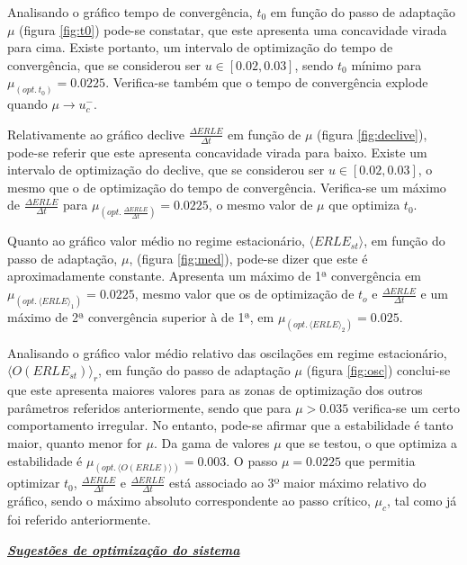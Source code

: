 \documentclass[a4paper,11pt]{report}
\begin{document}
     
Analisando o gráfico tempo de convergência, $t_0$ em função do passo de adaptação $\mu$ (figura \ref{fig:t0}) pode-se constatar, que este apresenta uma concavidade virada para cima. Existe portanto, um intervalo de optimização do tempo de convergência,  que se considerou ser $u\in[0.02,0.03]$, sendo $t_0$ mínimo para $\mu_{(opt. \hspace{2pt} t_0)}=0.0225$. Verifica-se também que o tempo de convergência explode quando $\mu \to u_c^-$.\\
\par
Relativamente ao gráfico declive $\frac{\Delta ERLE}{\Delta t}$ em função de $\mu$ (figura \ref{fig:declive}), pode-se referir que este apresenta concavidade virada para baixo. Existe  um intervalo de optimização do declive,  que se considerou ser $u\in[0.02,0.03]$, o mesmo que o de optimização do tempo de convergência. Verifica-se um máximo de $\frac{\Delta ERLE}{\Delta t}$ para $\mu_{(opt. \hspace{2pt} \frac{\Delta ERLE}{\Delta t})}=0.0225$, o mesmo valor de $\mu$ que optimiza $t_0$.\\

\par Quanto ao gráfico valor médio no regime estacionário,  $\langle ERLE_{st} \rangle$, em função do passo de adaptação, $\mu$, (figura \ref{fig:med}), pode-se dizer que este é aproximadamente constante. Apresenta um máximo de 1ª convergência em $\mu_{\left({opt. \hspace{2pt} \langle ERLE \rangle}_1\right)}=0.0225$, mesmo valor que os de optimização de $t_o$ e $\frac{\Delta ERLE}{\Delta t}$ e um máximo de 2ª convergência superior à de 1ª, em $\mu_{\left({opt. \hspace{2pt} \langle ERLE \rangle}_2\right)}=0.025$.\\
\par

Analisando o gráfico valor médio relativo das oscilações em regime estacionário,  $\langle O(ERLE_{st})\rangle_r$, em função do passo de adaptação $\mu$ (figura \ref{fig:osc}) conclui-se que este apresenta maiores valores para as zonas de optimização dos outros parâmetros referidos anteriormente, sendo que para $\mu>0.035$ verifica-se um certo comportamento irregular. No entanto, pode-se afirmar que a estabilidade é tanto maior, quanto menor for $\mu$. Da gama de valores $\mu$ que se testou, o que optimiza a estabilidade é $\mu_{\left({opt. \hspace{2pt} \langle O(ERLE) \rangle}\right)}=0.003$. O passo $\mu=0.0225$ que permitia optimizar $t_0$, $\frac{\Delta ERLE}{\Delta t}$ e  $\frac{\Delta ERLE}{\Delta t}$ está associado ao 3º maior máximo relativo do gráfico, sendo o máximo absoluto correspondente ao passo crítico, $\mu_c$, tal como já foi referido anteriormente.\\
\par
\large\underline{{\textit{\textbf{Sugestões de optimização do sistema}}}}\\
\par
\end{document}
